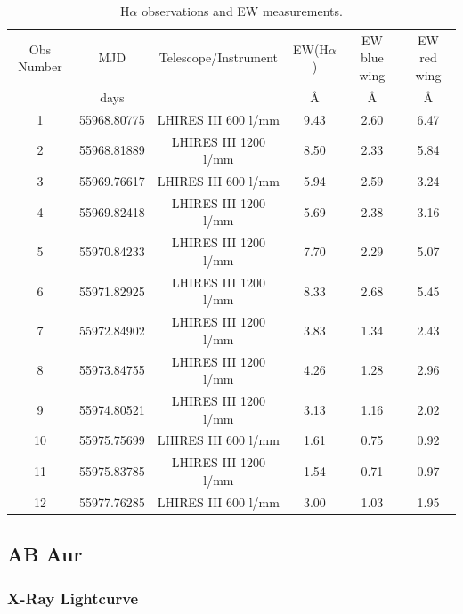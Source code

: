 \documentclass[twocolumn]{aastex631}
\newcommand\halpha{\ensuremath{{\text{H}\alpha}}}
\begin{document}
\begin{table}[]
    \centering
    \begin{tabular}{|c|c|c|c|c|c|}
        \hline
         Obs Number & MJD & Telescope/Instrument & EW(\halpha) & EW blue wing & EW red wing \\
         & days & & \AA & \AA & \AA \\
         \hline
         1  & 55968.80775 & LHIRES III 600 l/mm  & 9.43 & 2.60 & 6.47 \\
         2  & 55968.81889 & LHIRES III 1200 l/mm & 8.50 & 2.33 & 5.84 \\
         3  & 55969.76617 & LHIRES III 600 l/mm  & 5.94 & 2.59 & 3.24 \\
         4  & 55969.82418 & LHIRES III 1200 l/mm & 5.69 & 2.38 & 3.16 \\
         5  & 55970.84233 & LHIRES III 1200 l/mm & 7.70 & 2.29 & 5.07 \\
         6  & 55971.82925 & LHIRES III 1200 l/mm & 8.33 & 2.68 & 5.45 \\
         7  & 55972.84902 & LHIRES III 1200 l/mm & 3.83 & 1.34 & 2.43 \\
         8  & 55973.84755 & LHIRES III 1200 l/mm & 4.26 & 1.28 & 2.96 \\
         9  & 55974.80521 & LHIRES III 1200 l/mm & 3.13 & 1.16 & 2.02 \\
         10 & 55975.75699 & LHIRES III 600 l/mm  & 1.61 & 0.75 & 0.92 \\
         11 & 55975.83785 & LHIRES III 1200 l/mm & 1.54 & 0.71 & 0.97 \\
         12 & 55977.76285 & LHIRES III 600 l/mm  & 3.00 & 1.03 & 1.95 \\
         \hline
    \end{tabular}
    \caption{\halpha{} observations and EW measurements.}
    \label{table:ha_obs}
\end{table}


\subsection{AB Aur} \label{sec:ab_aur}
\subsubsection{X-Ray Lightcurve}
\end{document}
